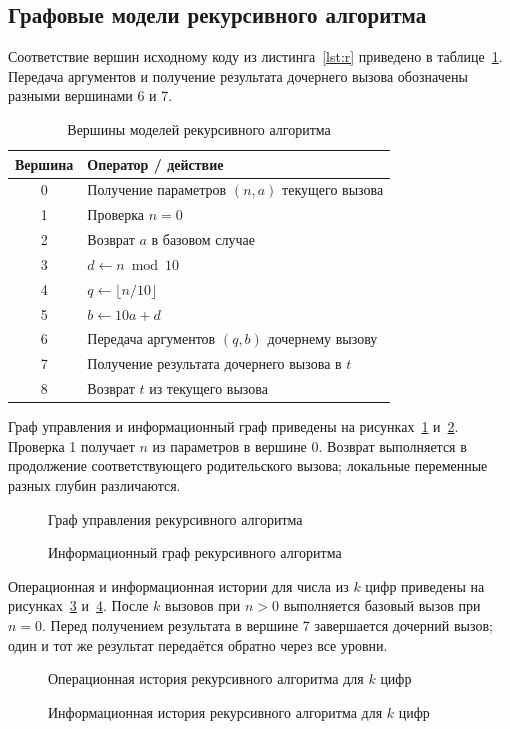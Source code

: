 \documentclass[14pt,a4paper]{extarticle}
\newcommand{\fig}[3]{\begin{figure}[H]\centering\caption{#2}\label{#3}\end{figure}}
\numberwithin{equation}{section}
\numberwithin{figure}{section}
\numberwithin{table}{section}
\begin{document}
\subsection{Графовые модели рекурсивного алгоритма}
Соответствие вершин исходному коду из листинга~\ref{lst:r} приведено в таблице~\ref{tab:rnodes}. Передача аргументов и получение результата дочернего вызова обозначены разными вершинами 6 и 7.
\begin{table}[H]\centering\caption{Вершины моделей рекурсивного алгоритма}\label{tab:rnodes}
\small\begin{tabularx}{\textwidth}{|c|>{\raggedright\arraybackslash}X|}\hline
\bfseries Вершина & \bfseries Оператор / действие\\\hline
0 & Получение параметров $(n,a)$ текущего вызова\\\hline
1 & Проверка $n=0$\\\hline
2 & Возврат $a$ в базовом случае\\\hline
3 & $d\gets n\bmod10$\\\hline
4 & $q\gets\lfloor n/10\rfloor$\\\hline
5 & $b\gets10a+d$\\\hline
6 & Передача аргументов $(q,b)$ дочернему вызову\\\hline
7 & Получение результата дочернего вызова в $t$\\\hline
8 & Возврат $t$ из текущего вызова\\\hline
\end{tabularx}\end{table}

Граф управления и информационный граф приведены на рисунках~\ref{fig:rc} и~\ref{fig:ri}. Проверка 1 получает $n$ из параметров в вершине 0. Возврат выполняется в продолжение соответствующего родительского вызова; локальные переменные разных глубин различаются.
\fig{rec_control}{Граф управления рекурсивного алгоритма}{fig:rc}
\fig{rec_information}{Информационный граф рекурсивного алгоритма}{fig:ri}

Операционная и информационная истории для числа из $k$ цифр приведены на рисунках~\ref{fig:ro} и~\ref{fig:rd}. После $k$ вызовов при $n>0$ выполняется базовый вызов при $n=0$. Перед получением результата в вершине 7 завершается дочерний вызов; один и тот же результат передаётся обратно через все уровни.
\fig{rec_operational}{Операционная история рекурсивного алгоритма для $k$ цифр}{fig:ro}
\fig{rec_dynamic}{Информационная история рекурсивного алгоритма для $k$ цифр}{fig:rd}
\end{document}
